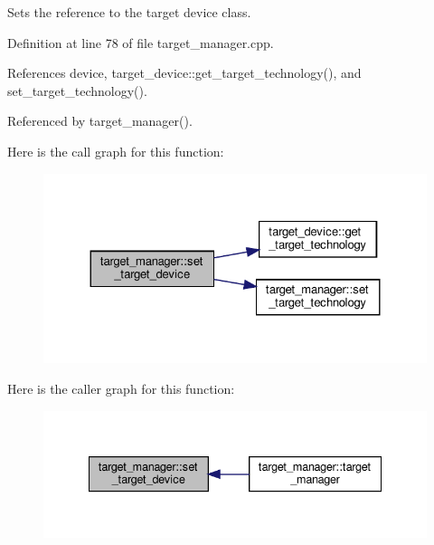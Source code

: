 Sets the reference to the target device class. 



Definition at line 78 of file target\+\_\+manager.\+cpp.



References device, target\+\_\+device\+::get\+\_\+target\+\_\+technology(), and set\+\_\+target\+\_\+technology().



Referenced by target\+\_\+manager().

Here is the call graph for this function\+:
\nopagebreak
\begin{figure}[H]
\begin{center}
\leavevmode
\includegraphics[width=324pt]{da/d43/classtarget__manager_aa58abbb383e12ce69562d9c6916f471c_cgraph}
\end{center}
\end{figure}
Here is the caller graph for this function\+:
\nopagebreak
\begin{figure}[H]
\begin{center}
\leavevmode
\includegraphics[width=335pt]{da/d43/classtarget__manager_aa58abbb383e12ce69562d9c6916f471c_icgraph}
\end{center}
\end{figure}
\mbox{\label{classtarget__manager_a2efdd4db15ea0230ea28fcad6a5bac53}} 
